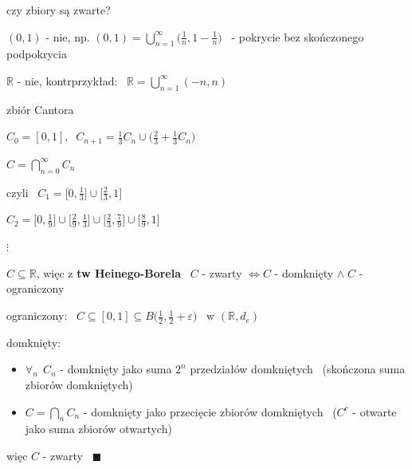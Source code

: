 \documentclass[a4paper,12pt]{article}
\begin{document}
\bigskip
{} \; czy zbiory są zwarte?
\begin{podpunkty}
    \item \((0, 1)\) - nie, np. \((0, 1) = \bigcup_{n=1}^{\infty} \big(\frac{1}{n}, 1 - \frac{1}{n}\big)\) \, - pokrycie bez skończonego podpokrycia
    \item \(\mathbb{R}\) - nie, kontrprzykład: \, \(\mathbb{R} = \bigcup_{n=1}^{\infty} (-n, n)\)
    \item zbiór Cantora

    \bigskip
    \begin{minipage}[c]{0.45\linewidth}
    \(C_0 = [0, 1], \;\; C_{n+1} = \frac{1}{3} C_n \cup \big(\frac{2}{3} + \frac{1}{3} C_n\big)\)

    \smallskip
    \(C = \bigcap_{n=0}^{\infty} C_n\)

    \smallskip
    czyli \, \(C_1 = \big[0, \frac{1}{3}\big] \cup \big[\frac{2}{3}, 1\big]\)

    \smallskip
    \(C_2 = \big[0, \frac{1}{9}\big] \cup \big[\frac{2}{9}, \frac{1}{3}\big] \cup \big[\frac{2}{3}, \frac{7}{9}\big] \cup \big[\frac{8}{9}, 1\big]\)

    \(\vdots\)
    \end{minipage}
    \hspace{1.5em}



    \bigskip
    \(C \subseteq \mathbb{R}\), więc z \textbf{tw Heinego-Borela} \, \(C\) - zwarty \(\iff C\) - domknięty \(\land \; C\) - ograniczony

    \smallskip
    ograniczony: \, \(C \subseteq [0, 1] \subseteq B\big(\frac{1}{2}, \frac{1}{2} + \varepsilon\big)\) \, w \((\mathbb{R}, d_e)\)

    domknięty:
    \begin{itemize}
        \item \(\forall_n \;\, C_n\) - domknięty jako suma \(2^n\) przedziałów domkniętych \, (skończona suma zbiorów domkniętych)
        \item \(C = \bigcap_n C_n\) - domknięty jako przecięcie zbiorów domkniętych \, (\(C^c\) - otwarte jako suma zbiorów otwartych)
    \end{itemize}
    więc \(C\) - zwarty \, \(\blacksquare\)
\end{podpunkty}
\end{document}
